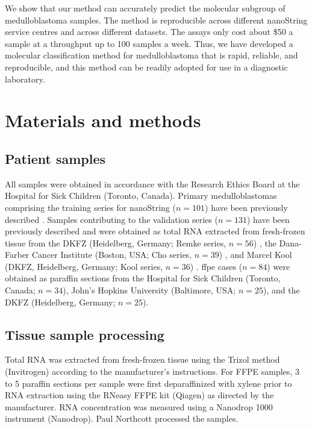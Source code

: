 We show that our method can accurately predict the molecular subgroup of medulloblastoma samples. The method is reproducible across different nanoString service centres and across different datasets. The assays only cost about \$50 a sample at a throughput up to 100 samples a week. Thus, we have developed a molecular classification method for medulloblastoma that is rapid, reliable, and reproducible, and this method can be readily adopted for use in a diagnostic laboratory.


\section{Materials and methods}

\subsection{Patient samples}

All samples were obtained in accordance with the Research Ethics Board at the Hospital for Sick Children (Toronto, Canada). Primary medulloblastomas comprising the training series for nanoString ($n = 101$) have been previously described . Samples contributing to the validation series ($n = 131$) have been previously described and were obtained as total RNA extracted from fresh-frozen tissue from the DKFZ (Heidelberg, Germany; Remke series, $n = 56$) , the Dana-Farber Cancer Institute (Boston, USA; Cho series, $n = 39$) , and Marcel Kool (DKFZ, Heidelberg, Germany; Kool series, $n = 36$) .  \gls{ffpe} cases ($n = 84$) were obtained as paraffin sections from the Hospital for Sick Children (Toronto, Canada; $n = 34$), John’s Hopkins University (Baltimore, USA; $n = 25$), and the DKFZ (Heidelberg, Germany; $n = 25$).

\subsection{Tissue sample processing}

Total RNA was extracted from fresh-frozen tissue using the Trizol method (Invitrogen) according to the manufacturer's instructions.  For FFPE samples, 3 to 5 paraffin sections per sample were first deparaffinized with xylene prior to RNA extraction using the RNeasy FFPE kit (Qiagen) as directed by the manufacturer.  RNA concentration was measured using a Nanodrop 1000 instrument (Nanodrop). Paul Northcott processed the samples.

